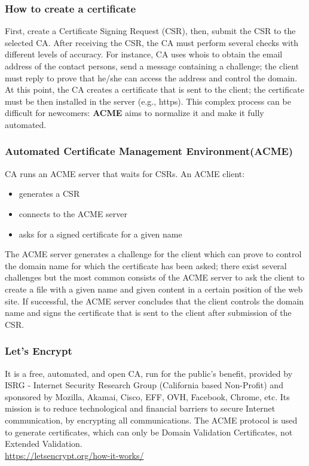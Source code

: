 \documentclass[a4paper, 10pt, titlepage]{article}
\begin{document}
\subsubsection{How to create a certificate}
First, create a Certificate Signing Request (CSR), then, submit the CSR to the selected CA. After receiving the CSR, the CA must perform several checks with different levels of accuracy. For instance, CA uses whois to obtain the email address of the contact persons, send a message containing a challenge; the client must reply to prove that he/she can access the address and control the domain. At this point, the CA creates a certificate that is sent to the client; the certificate must be then installed in the server (e.g., https). This complex process can be difficult for newcomers: \textbf{ACME} aims to normalize it and make it fully automated.

\subsubsection{Automated Certificate Management Environment(ACME)}
CA runs an ACME server that waits for CSRs. An ACME client:
\begin{itemize}
\item generates a CSR
\item connects to the ACME server
\item asks for a signed certificate for a given name
\end{itemize}
The ACME server generates a challenge for the client which can prove to control the domain name for which the certificate has been asked; there exist several challenges but the most common consists of the ACME server to ask the client to create a file with a given name and given content in a certain position of the web site. If successful, the ACME server concludes that the client controls the domain name and signs the certificate that is sent to the client after submission of the CSR.

\subsubsection{Let's Encrypt}
It is a free, automated, and open CA, run for the public’s benefit, provided by ISRG - Internet Security Research Group (California based Non-Profit) and sponsored by Mozilla, Akamai, Cisco, EFF, OVH, Facebook, Chrome, etc. Its mission is to reduce technological and financial barriers to secure Internet communication, by encrypting all communications. The ACME protocol is used to generate certificates, which can only be Domain Validation Certificates, not Extended Validation. \medskip\\
\url{https://letsencrypt.org/how-it-works/}
\end{document}
